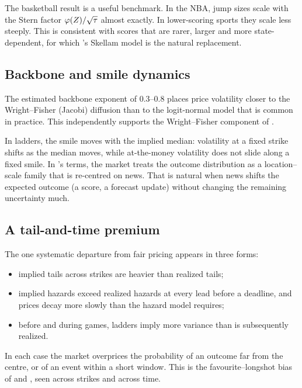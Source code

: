 The basketball result is a useful benchmark. In the NBA, jump sizes scale with the Stern factor
$\varphi(Z)/\sqrt{\tau}$ almost exactly. In lower-scoring sports they scale less steeply.
This is consistent with scores that are rarer, larger and more state-dependent, for which
\citet{fengpolsonxu2016}'s Skellam model is the natural replacement.

\subsection{Backbone and smile dynamics}

The estimated backbone exponent of 0.3--0.8 places price volatility closer to the Wright--Fisher
(Jacobi) diffusion than to the logit-normal model that is common in practice. This independently
supports the Wright--Fisher component of \citet{xi2026}.

In ladders, the smile moves with the implied median: volatility at a fixed strike shifts as the
median moves, while at-the-money volatility does not slide along a fixed smile. In
\citet{derman1999}'s terms, the market treats the outcome distribution as a location--scale family
that is re-centred on news. That is natural when news shifts the expected outcome (a score, a
forecast update) without changing the remaining uncertainty much.

\subsection{A tail-and-time premium}

The one systematic departure from fair pricing appears in three forms:
\begin{itemize}
  \item implied tails across strikes are heavier than realized tails;
  \item implied hazards exceed realized hazards at every lead before a deadline, and prices decay
  more slowly than the hazard model requires;
  \item before and during games, ladders imply more variance than is subsequently realized.
\end{itemize}
In each case the market overprices the probability of an outcome far from the centre, or of an
event within a short window. This is the favourite--longshot bias of \citet{snowbergwolfers2010}
and \citet{burgi2025}, seen across strikes and across time.

